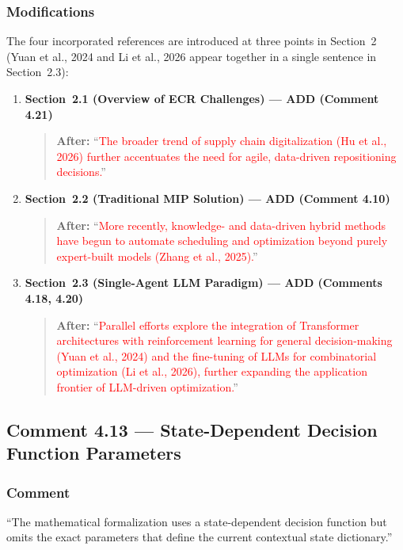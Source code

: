 \documentclass[11pt,a4paper]{article}
\begin{document}
\subsubsection{Modifications}
The four incorporated references are introduced at three points in Section~2 (Yuan et al., 2024 and Li et al., 2026 appear together in a single sentence in Section~2.3):
\begin{enumerate}
\item \textbf{Section~2.1 (Overview of ECR Challenges) --- ADD (Comment 4.21)}
\begin{quote}
\textbf{After:} ``\textcolor{red}{The broader trend of supply chain digitalization (Hu et al., 2026) further accentuates the need for agile, data-driven repositioning decisions.}''
\end{quote}
\item \textbf{Section~2.2 (Traditional MIP Solution) --- ADD (Comment 4.10)}
\begin{quote}
\textbf{After:} ``\textcolor{red}{More recently, knowledge- and data-driven hybrid methods have begun to automate scheduling and optimization beyond purely expert-built models (Zhang et al., 2025).}''
\end{quote}
\item \textbf{Section~2.3 (Single-Agent LLM Paradigm) --- ADD (Comments 4.18, 4.20)}
\begin{quote}
\textbf{After:} ``\textcolor{red}{Parallel efforts explore the integration of Transformer architectures with reinforcement learning for general decision-making (Yuan et al., 2024) and the fine-tuning of LLMs for combinatorial optimization (Li et al., 2026), further expanding the application frontier of LLM-driven optimization.}''
\end{quote}
\end{enumerate}
\subsection{Comment 4.13 --- State-Dependent Decision Function Parameters}

\subsubsection{Comment}
``The mathematical formalization uses a state-dependent decision function but omits the exact parameters that define the current contextual state dictionary.''
\end{document}
